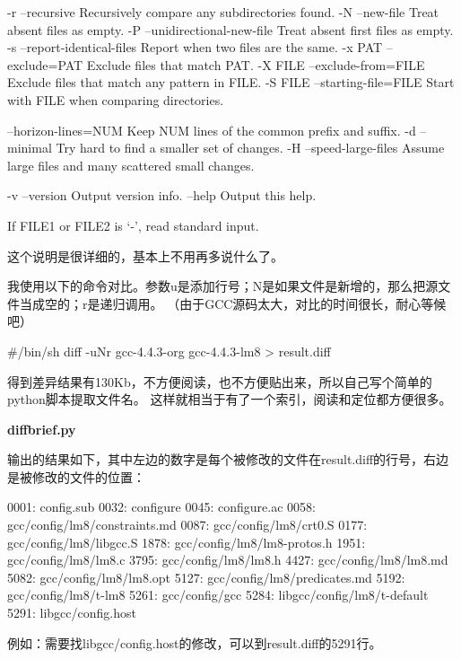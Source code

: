 \begin{textcode}
  -r  --recursive  Recursively compare any subdirectories found.
  -N  --new-file  Treat absent files as empty.
  -P  --unidirectional-new-file  Treat absent first files as empty.
  -s  --report-identical-files  Report when two files are the same.
  -x PAT  --exclude=PAT  Exclude files that match PAT.
  -X FILE  --exclude-from=FILE  Exclude files that match any pattern in FILE.
  -S FILE  --starting-file=FILE  Start with FILE when comparing directories.

  --horizon-lines=NUM  Keep NUM lines of the common prefix and suffix.
  -d  --minimal  Try hard to find a smaller set of changes.
  -H  --speed-large-files  Assume large files and many scattered small changes.

  -v  --version  Output version info.
  --help  Output this help.

If FILE1 or FILE2 is `-', read standard input.
\end{textcode}

这个说明是很详细的，基本上不用再多说什么了。

我使用以下的命令对比。参数u是添加行号；N是如果文件是新增的，那么把源文件当成空的；r是递归调用。
（由于GCC源码太大，对比的时间很长，耐心等候吧）
\begin{shcode}
#/bin/sh
diff -uNr gcc-4.4.3-org gcc-4.4.3-lm8 > result.diff
\end{shcode}

得到差异结果有130Kb，不方便阅读，也不方便贴出来，所以自己写个简单的python脚本提取文件名。
这样就相当于有了一个索引，阅读和定位都方便很多。

\textbf{diffbrief.py}


输出的结果如下，其中左边的数字是每个被修改的文件在result.diff的行号，右边是被修改的文件的位置：
\begin{textcode}
0001: config.sub
0032: configure
0045: configure.ac
0058: gcc/config/lm8/constraints.md
0087: gcc/config/lm8/crt0.S
0177: gcc/config/lm8/libgcc.S
1878: gcc/config/lm8/lm8-protos.h
1951: gcc/config/lm8/lm8.c
3795: gcc/config/lm8/lm8.h
4427: gcc/config/lm8/lm8.md
5082: gcc/config/lm8/lm8.opt
5127: gcc/config/lm8/predicates.md
5192: gcc/config/lm8/t-lm8
5261: gcc/config/gcc
5284: libgcc/config/lm8/t-default
5291: libgcc/config.host
\end{textcode}
例如：需要找libgcc/config.host的修改，可以到result.diff的5291行。

\clearpage
